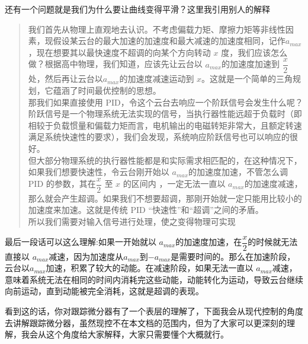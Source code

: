 \documentclass[UTF8,a4paper,12pt]{ctexart}
\begin{document}
            还有一个问题就是我们为什么要让曲线变得平滑？这里我引用别人的解释
            \begin{notitlebox}
              
              \begin{quotation}
                我们首先从物理上直观地去认识。不考虑偏载力矩、摩擦力矩等非线性因素，现假设某云台的最大加速的加速度和最大减速的加速度相同，记作$ a_{max}$，现在想要其以最快速度不超调的向某个方向转动 $x$ 度，我们应该怎么做？根据高中物理，我们知道，应该先让云台以 $a_{max}$的加速度加速到 $\dfrac{x}{2}$处，然后再让云台以$a_{max}$的加速度减速运动到 $x$。这就是一个简单的三角规划，它蕴涵了时间最优控制的思想。
                \\\indent 那我们如果直接使用 PID，令这个云台去响应一个阶跃信号会发生什么呢？阶跃信号是一个物理系统无法实现的信号，当执行器性能远超于负载时（即相较于负载惯量和偏载力矩而言，电机输出的电磁转矩非常大，且额定转速满足系统快速性的要求），我们会发现，系统响应阶跃信号也可以响应的很好。
                \\\indent 但大部分物理系统的执行器性能都是和实际需求相匹配的，在这种情况下，如果我们想要快速性，令云台刚开始以 $a_{max}$的加速度加速，不管怎么调 PID 的参数，其在$\dfrac{x}{2}$ 至 $x$ 的区间内 ，一定无法一直以 $a_{max}$的加速度减速，那么就会产生超调。如果我们不想要超调，那刚开始就一定只能用比较小的加速度来加速。这就是传统 PID “快速性”和“超调”之间的矛盾。
                \\ \indent 所以我们需要对输入信号进行处理，使之变得物理可实现
              \end{quotation}
            
            \end{notitlebox}
             \begin{flushleft}
              最后一段话可以这么理解:如果一开始就以 $a_{max}$的加速度加速，在$\dfrac{x}{2}$的时候就无法直接以 $a_{max}$减速，因为加速度从$a_{max}$到$-a_{max}$是需要时间的。那么在加速阶段，云台以$a_{max}$加速，积累了较大的动能。在减速阶段，如果无法一直以 $a_{max}$减速，意味着系统无法在相同的时间内消耗完这些动能，动能转化为运动，导致云台继续向前运动，直到动能被完全消耗，这就是超调的表现。
             \end{flushleft}

            \begin{flushleft}
              看到这的话，你对跟踪微分器有了一个表层的理解了，下面我会从现代控制的角度去讲解跟踪微分器，虽然现控不在本文档的范围内，但为了大家可以更深刻的理解，我会从这个角度给大家解释，大家只需要懂个大概就行。
            \end{flushleft}
            
\end{document}
